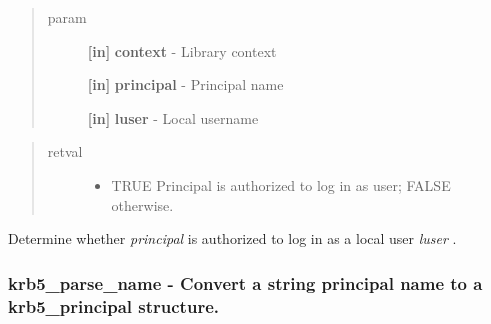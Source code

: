 \documentclass[letterpaper,10pt,english]{sphinxmanual}
\begin{document}
\begin{quote}\begin{description}
\item[{param}] \leavevmode
\textbf{{[}in{]}} \textbf{context} - Library context

\textbf{{[}in{]}} \textbf{principal} - Principal name

\textbf{{[}in{]}} \textbf{luser} - Local username

\end{description}\end{quote}
\begin{quote}\begin{description}
\item[{retval}] \leavevmode\begin{itemize}
\item {} 
TRUE   Principal is authorized to log in as user; FALSE otherwise.

\end{itemize}

\end{description}\end{quote}

Determine whether \emph{principal} is authorized to log in as a local user \emph{luser} .


\subsubsection{krb5\_parse\_name -  Convert a string principal name to a krb5\_principal structure.}
\label{appdev/refs/api/krb5_parse_name::doc}\label{appdev/refs/api/krb5_parse_name:krb5-parse-name-convert-a-string-principal-name-to-a-krb5-principal-structure}

\begin{fulllineitems}
\label{appdev/refs/api/krb5_parse_name:c.krb5_parse_name}
\end{fulllineitems}
\end{document}

